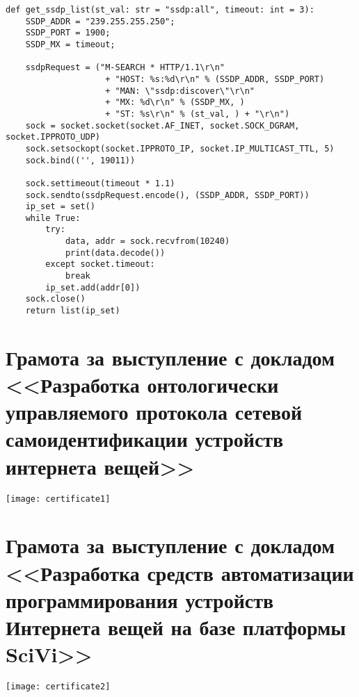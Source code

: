 \begin{verbatim}
def get_ssdp_list(st_val: str = "ssdp:all", timeout: int = 3):
    SSDP_ADDR = "239.255.255.250";
    SSDP_PORT = 1900;
    SSDP_MX = timeout;

    ssdpRequest = ("M-SEARCH * HTTP/1.1\r\n"
                    + "HOST: %s:%d\r\n" % (SSDP_ADDR, SSDP_PORT)
                    + "MAN: \"ssdp:discover\"\r\n"
                    + "MX: %d\r\n" % (SSDP_MX, )
                    + "ST: %s\r\n" % (st_val, ) + "\r\n")
    sock = socket.socket(socket.AF_INET, socket.SOCK_DGRAM, socket.IPPROTO_UDP)
    sock.setsockopt(socket.IPPROTO_IP, socket.IP_MULTICAST_TTL, 5)
    sock.bind(('', 19011))

    sock.settimeout(timeout * 1.1)
    sock.sendto(ssdpRequest.encode(), (SSDP_ADDR, SSDP_PORT))
    ip_set = set()
    while True:
        try:
            data, addr = sock.recvfrom(10240)
            print(data.decode())
        except socket.timeout:
            break
        ip_set.add(addr[0])
    sock.close()
    return list(ip_set)

\end{verbatim}


\chapter{Грамота за выступление с докладом <<Разработка онтологически управляемого протокола сетевой самоидентификации устройств интернета вещей>>} \label{appendix:certificate1}

\texttt{[image: certificate1]}

\chapter{Грамота за выступление с докладом <<Разработка средств автоматизации программирования устройств Интернета вещей на базе платформы SciVi>>} \label{appendix:certificate2}

\texttt{[image: certificate2]}
